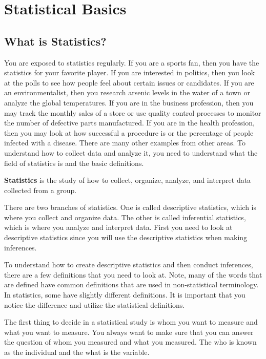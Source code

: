 \documentclass[]{book}
\begin{document}
\hypertarget{statistical-basics}{%
\chapter{Statistical Basics}\label{statistical-basics}}

\hypertarget{what-is-statistics}{%
\section{What is Statistics?}\label{what-is-statistics}}

You are exposed to statistics regularly. If you are a sports fan, then you have the statistics for your favorite player. If you are interested in politics, then you look at the polls to see how people feel about certain issues or candidates. If you are an environmentalist, then you research arsenic levels in the water of a town or analyze the global temperatures. If you are in the business profession, then you may track the monthly sales of a store or use quality control processes to monitor the number of defective parts manufactured. If you are in the health profession, then you may look at how successful a procedure is or the percentage of people infected with a disease. There are many other examples from other areas. To understand how to collect data and analyze it, you need to understand what the field of statistics is and the basic definitions.

\textbf{Statistics} is the study of how to collect, organize, analyze, and interpret data collected from a group.

There are two branches of statistics. One is called descriptive statistics, which is where you collect and organize data. The other is called inferential statistics, which is where you analyze and interpret data. First you need to look at descriptive statistics since you will use the descriptive statistics when making inferences.

To understand how to create descriptive statistics and then conduct inferences, there are a few definitions that you need to look at. Note, many of the words that are defined have common definitions that are used in non-statistical terminology. In statistics, some have slightly different definitions. It is important that you notice the difference and utilize the statistical definitions.

The first thing to decide in a statistical study is whom you want to measure and what you want to measure. You always want to make sure that you can answer the question of whom you measured and what you measured. The who is known as the individual and the what is the variable.
\end{document}
